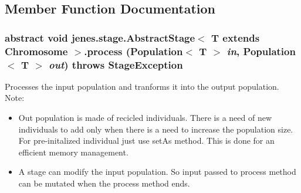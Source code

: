 \subsection{Member Function Documentation}
\hypertarget{classjenes_1_1stage_1_1_abstract_stage_3_01_t_01extends_01_chromosome_01_4_1e8398b28d820dc0e7343b15ce19c703}{
\subsubsection[process]{\setlength{\rightskip}{0pt plus 5cm}abstract void jenes.stage.AbstractStage$<$ T extends Chromosome $>$.process (Population$<$ T $>$ {\em in}, \/  Population$<$ T $>$ {\em out})  throws {\bf StageException}}}
\label{classjenes_1_1stage_1_1_abstract_stage_3_01_t_01extends_01_chromosome_01_4_1e8398b28d820dc0e7343b15ce19c703}


Processes the input population and tranforms it into the output population. Note:\begin{itemize}
\item Out population is made of recicled individuals. There is a need of new individuals to add only when there is a need to increase the population size. For pre-initalized individual just use setAs method. This is done for an efficient memory management.\item A stage can modify the input population. So input passed to process method can be mutated when the process method ends. \end{itemize}


